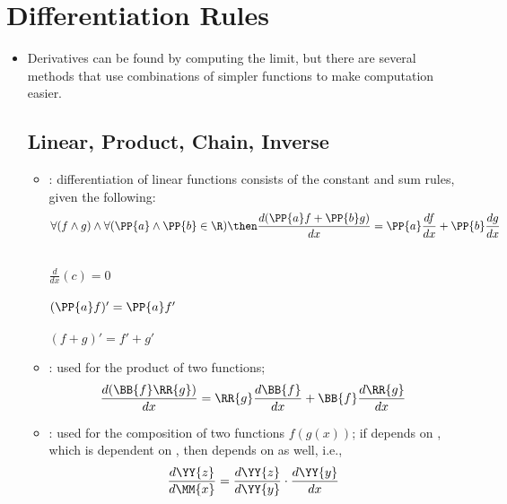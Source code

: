 \section{Differentiation Rules}
\begin{itemize}
   \item Derivatives can be found by computing the limit, but there are several
     methods that use combinations of simpler functions to make computation
     easier.

  \subsection{Linear, Product, Chain, Inverse}
  \begin{itemize}
    \item {}: differentiation of linear functions consists of the
      constant and sum rules, given the following:
    \[
      \forall(f \land g) \land \forall(\PP{a} \land \PP{b} \in \R) \then
      \frac{d(\PP{a}f + \PP{b}g)}{dx} = \PP{a}\frac{df}{dx} +
      \PP{b}\frac{dg}{dx}
    \]
    \vspace{-18pt}
    \begin{multicols}{3}
       \\ \( \frac{d}{dx} (c) = 0\) \\
       \\ \( (\PP{a}f)' = \PP{a}f' \) \\
       \\ \( (f + g)' = f' + g' \) \\
    \end{multicols}

    \item {}: used for the product of two functions;
      \[
        \frac{d(\BB{f}\RR{g})}{dx} = \RR{g} \frac{d\BB{f}}{dx} +
        \BB{f}\frac{d\RR{g}}{dx}
      \]
    \item {}: used for the composition of two functions \( f(g(x))
      \); if  depends on , which is dependent on
      , then  depends on  as well, i.e.,
      \[
        \frac{d \YY{z}}{d \MM{x}} = \frac{d \YY{z}}{d \YY{y}} \cdot \frac{d
        \YY{y}}{dx}
      \]
      \begin{itemize}


\end{itemize}
\end{itemize}
\end{itemize}
